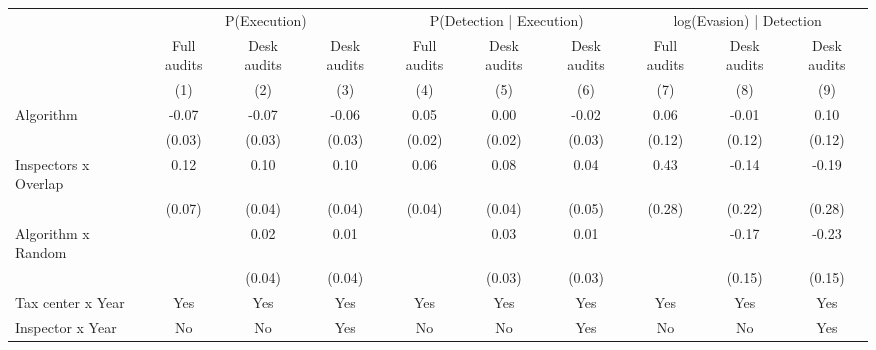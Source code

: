 \begin{tabular}{lccc|ccc|ccc} \toprule
\multicolumn{1}{l}{} & \multicolumn{3}{c}{P(Execution)} & \multicolumn{3}{c}{P(Detection | Execution)} & \multicolumn{3}{c}{log(Evasion) | Detection} \\\cmidrule(lr){2-4}\cmidrule(lr){5-7}\cmidrule(lr){8-10} \multicolumn{1}{l}{} & Full audits & Desk audits & Desk audits & Full audits & Desk audits & Desk audits & Full audits & Desk audits & Desk audits \\ \multicolumn{1}{l}{} & (1) & (2) & (3) & (4) & (5) & (6) & (7) & (8) & (9) \\ \midrule
Algorithm   &       -0.07\sym{*}  &       -0.07\sym{**} &       -0.06\sym{**} &        0.05\sym{**} &        0.00         &       -0.02         &        0.06         &       -0.01         &        0.10         \\
            &      (0.03)         &      (0.03)         &      (0.03)         &      (0.02)         &      (0.02)         &      (0.03)         &      (0.12)         &      (0.12)         &      (0.12)         \\
\addlinespace
Inspectors x Overlap&        0.12\sym{*}  &        0.10\sym{**} &        0.10\sym{**} &        0.06\sym{*}  &        0.08\sym{**} &        0.04         &        0.43         &       -0.14         &       -0.19         \\
            &      (0.07)         &      (0.04)         &      (0.04)         &      (0.04)         &      (0.04)         &      (0.05)         &      (0.28)         &      (0.22)         &      (0.28)         \\
\addlinespace
Algorithm x Random&                     &        0.02         &        0.01         &                     &        0.03         &        0.01         &                     &       -0.17         &       -0.23         \\
            &                     &      (0.04)         &      (0.04)         &                     &      (0.03)         &      (0.03)         &                     &      (0.15)         &      (0.15)         \\
\midrule
Tax center x Year&         Yes         &         Yes         &         Yes         &         Yes         &         Yes         &         Yes         &         Yes         &         Yes         &         Yes         \\
Inspector x Year&          No         &          No         &         Yes         &          No         &          No         &         Yes         &          No         &          No         &         Yes         \\

\end{tabular}
